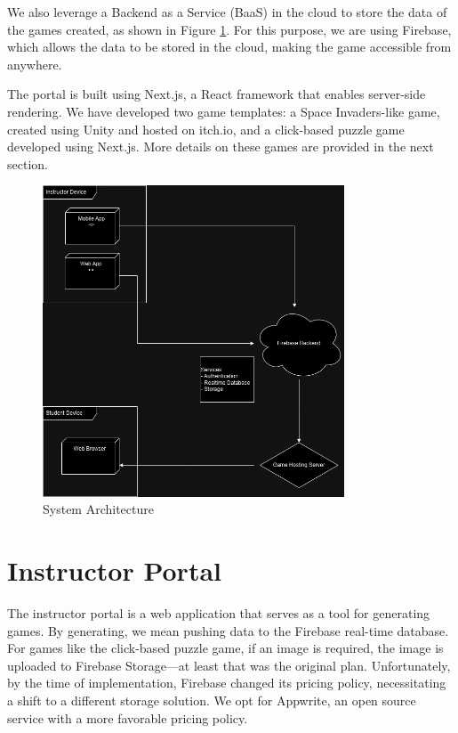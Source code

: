 We also leverage a Backend as a Service (BaaS) in the cloud to store the data of the games created, as shown in Figure \ref{fig:architecture}. For this purpose, we are using Firebase, which allows the data to be stored in the cloud, making the game accessible from anywhere.

The portal is built using Next.js, a React framework that enables server-side rendering. We have developed two game templates: a Space Invaders-like game, created using Unity and hosted on itch.io, and a click-based puzzle game developed using Next.js. More details on these games are provided in the next section.

\begin{figure}
\centering
\includegraphics[width=0.8\textwidth]{figures/Deployment_UML.jpg}
\caption{System Architecture}
\label{fig:architecture}
\end{figure}

\section{Instructor Portal}

The instructor portal is a web application that serves as a tool for generating games. By generating, we mean pushing data to the Firebase real-time database. For games like the click-based puzzle game, if an image is required, the image is uploaded to Firebase Storage—at least that was the original plan. Unfortunately, by the time of implementation, Firebase changed its pricing policy, necessitating a shift to a different storage solution. We opt for Appwrite, an open source service with a more favorable pricing policy.

